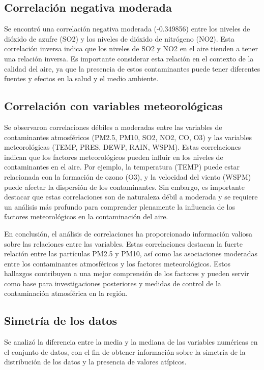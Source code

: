 \subsection{\textbf{Correlación negativa moderada}}
Se encontró una correlación negativa moderada (-0.349856) entre los niveles de dióxido de azufre (SO2) y los niveles de dióxido de nitrógeno (NO2). Esta correlación inversa indica que los niveles de SO2 y NO2 en el aire tienden a tener una relación inversa. Es importante considerar esta relación en el contexto de la calidad del aire, ya que la presencia de estos contaminantes puede tener diferentes fuentes y efectos en la salud y el medio ambiente.

\subsection{\textbf{Correlación con variables meteorológicas}}
Se observaron correlaciones débiles a moderadas entre las variables de contaminantes atmosféricos (PM2.5, PM10, SO2, NO2, CO, O3) y las variables meteorológicas (TEMP, PRES, DEWP, RAIN, WSPM). Estas correlaciones indican que los factores meteorológicos pueden influir en los niveles de contaminantes en el aire. Por ejemplo, la temperatura (TEMP) puede estar relacionada con la formación de ozono (O3), y la velocidad del viento (WSPM) puede afectar la dispersión de los contaminantes. Sin embargo, es importante destacar que estas correlaciones son de naturaleza débil a moderada y se requiere un análisis más profundo para comprender plenamente la influencia de los factores meteorológicos en la contaminación del aire.

En conclusión, el análisis de correlaciones ha proporcionado información valiosa sobre las relaciones entre las variables. Estas correlaciones destacan la fuerte relación entre las partículas PM2.5 y PM10, así como las asociaciones moderadas entre los contaminantes atmosféricos y los factores meteorológicos. Estos hallazgos contribuyen a una mejor comprensión de los factores y pueden servir como base para investigaciones posteriores y medidas de control de la contaminación atmosférica en la región.\cite{liang2017comparison}

\subsection{\textbf{Simetría de los datos}}
Se analizó la diferencia entre la media y la mediana de las variables numéricas en el conjunto de datos, con el fin de obtener información sobre la simetría de la distribución de los datos y la presencia de valores atípicos. 

